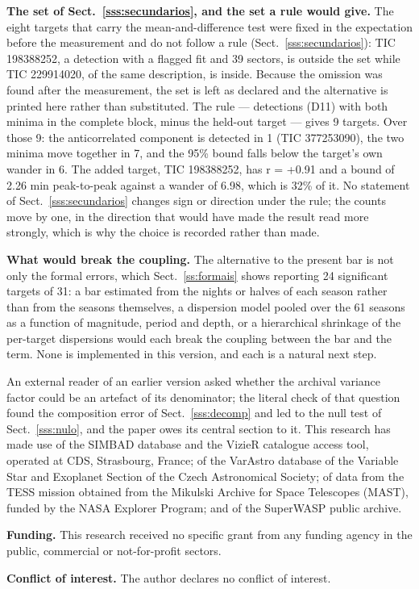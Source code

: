\documentclass{aa}
\begin{document}
\textbf{The set of Sect.~\ref{sss:secundarios}, and the set a rule would give.} The eight targets that carry the mean-and-difference test were fixed in the expectation before the measurement and do not follow a rule (Sect.~\ref{sss:secundarios}): TIC 198388252, a detection with a flagged fit and 39 sectors, is outside the set while TIC 229914020, of the same description, is inside. Because the omission was found after the measurement, the set is left as declared and the alternative is printed here rather than substituted. The rule --- detections (D11) with both minima in the complete block, minus the held-out target --- gives 9 targets. Over those 9: the anticorrelated component is detected in 1 (TIC 377253090), the two minima move together in 7, and the 95\% bound falls below the target's own wander in 6. The added target, TIC 198388252, has r = +0.91 and a bound of 2.26 min peak-to-peak against a wander of 6.98, which is 32\% of it. No statement of Sect.~\ref{sss:secundarios} changes sign or direction under the rule; the counts move by one, in the direction that would have made the result read more strongly, which is why the choice is recorded rather than made.

\textbf{What would break the coupling.} The alternative to the present bar is not only the formal errors, which Sect.~\ref{ss:formais} shows reporting 24 significant targets of 31: a bar estimated from the nights or halves of each season rather than from the seasons themselves, a dispersion model pooled over the 61 seasons as a function of magnitude, period and depth, or a hierarchical shrinkage of the per-target dispersions would each break the coupling between the bar and the term. None is implemented in this version, and each is a natural next step.


\begin{acknowledgements}
An external reader of an earlier version asked whether the archival variance factor could be an artefact of its denominator; the literal check of that question found the composition error of Sect.~\ref{sss:decomp} and led to the null test of Sect.~\ref{sss:nulo}, and the paper owes its central section to it. This research has made use of the SIMBAD database and the VizieR catalogue access tool, operated at CDS, Strasbourg, France; of the VarAstro database of the Variable Star and Exoplanet Section of the Czech Astronomical Society; of data from the TESS mission obtained from the Mikulski Archive for Space Telescopes (MAST), funded by the NASA Explorer Program; and of the SuperWASP public archive.

\textbf{Funding.} This research received no specific grant from any funding agency in the public, commercial or not-for-profit sectors.

\textbf{Conflict of interest.} The author declares no conflict of interest.
\end{acknowledgements}
\end{document}
